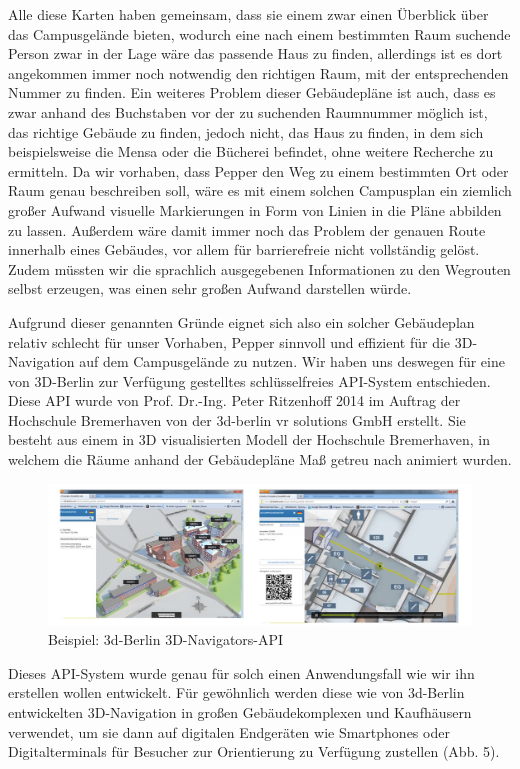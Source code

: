 Alle diese Karten haben gemeinsam, dass sie einem zwar einen Überblick über das Campusgelände bieten, wodurch eine nach einem bestimmten Raum suchende Person zwar in der Lage wäre das passende Haus zu finden, allerdings ist es dort angekommen immer noch notwendig den richtigen Raum, mit der entsprechenden Nummer zu finden. Ein weiteres Problem dieser Gebäudepläne ist auch, dass es zwar anhand des Buchstaben vor der zu suchenden Raumnummer möglich ist, das richtige Gebäude zu finden, jedoch nicht, das Haus zu finden, in dem sich beispielsweise die Mensa oder die Bücherei befindet, ohne weitere Recherche zu ermitteln. Da wir vorhaben, dass Pepper den Weg zu einem bestimmten Ort oder Raum genau beschreiben soll, wäre es mit einem solchen Campusplan ein ziemlich großer Aufwand visuelle Markierungen in Form von Linien in die Pläne abbilden zu lassen. Außerdem wäre damit immer noch das Problem der genauen Route innerhalb eines Gebäudes, vor allem für barrierefreie nicht vollständig gelöst. Zudem müssten wir die sprachlich ausgegebenen Informationen zu den Wegrouten selbst erzeugen, was einen sehr großen Aufwand darstellen würde.

Aufgrund dieser genannten Gründe eignet sich also ein solcher Gebäudeplan relativ schlecht für unser Vorhaben, Pepper sinnvoll und effizient für die 3D-Navigation auf dem Campusgelände zu nutzen. Wir haben uns deswegen für eine von 3D-Berlin zur Verfügung gestelltes schlüsselfreies API-System entschieden. Diese API wurde von Prof. Dr.-Ing. Peter Ritzenhoff 2014 im Auftrag der Hochschule Bremerhaven von der 3d-berlin vr solutions GmbH erstellt. Sie besteht aus einem in 3D visualisierten Modell der Hochschule Bremerhaven, in welchem die Räume anhand der Gebäudepläne Maß getreu nach animiert wurden.

\begin{figure}[H]
    \includegraphics[width=\textwidth]{Figures/3DNavigator/3d-berlin_bsp.jpg}
    \caption{Beispiel: 3d-Berlin 3D-Navigators-API}
    \label{fig:integration}
    \centering
\end{figure}
\vspace{-2.5mm}
Dieses API-System wurde genau für solch einen Anwendungsfall wie wir ihn erstellen wollen entwickelt. Für gewöhnlich werden diese wie von 3d-Berlin entwickelten 3D-Navigation in großen Gebäudekomplexen und Kaufhäusern verwendet, um sie dann auf digitalen Endgeräten wie Smartphones oder Digitalterminals für Besucher zur Orientierung zu Verfügung zustellen (Abb. 5).\vspace{-2.5mm}

